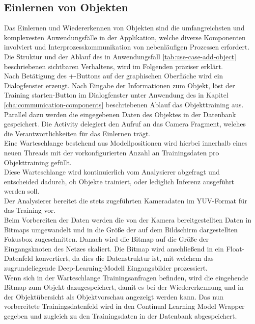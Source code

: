 \documentclass[oneside]{ausarbeitung}
\begin{document}
\subsection{Einlernen von Objekten}
\label{cha:train-objects}
Das Einlernen und Wiedererkennen von Objekten sind die umfangreichsten und komplexesten Anwendungsfälle in der Applikation, welche diverse Komponenten involviert und Interprozesskommunikation von nebenläufigen Prozessen erfordert.\\
Die Struktur und der Ablauf des in Anwendungsfall \ref{tab:use-case-add-object} beschriebenen sichtbaren Verhaltens, wird im Folgenden präziser erklärt.\\
Nach Betätigung des \glqq +\grqq-Buttons auf der graphischen Oberfläche wird ein Dialogfenster erzeugt. Nach Eingabe der Informationen zum Objekt, löst der \glqq Training starten\grqq-Button im Dialogfenster unter Anwendung des in Kapitel \ref{cha:communication-components} beschriebenen Ablauf das Objekttraining aus. Parallel dazu werden die eingegebenen Daten des Objektes in der Datenbank gespeichert. Die Activity delegiert den Aufruf an das Camera Fragment, welches die Verantwortlichkeiten für das Einlernen trägt. \\
Eine Warteschlange bestehend aus Modellpositionen wird hierbei innerhalb eines neuen Threads mit der vorkonfigurierten Anzahl an Trainingsdaten pro Objekttraining gefüllt.\\
Diese Warteschlange wird kontinuierlich vom Analysierer abgefragt und entscheided dadurch, ob Objekte trainiert, oder lediglich Inferenz ausgeführt werden soll.\\
Der Analysierer bereitet die stets zugeführten Kameradaten im YUV-Format für das Training vor.\\
Beim Vorbereiten der Daten werden die von der Kamera bereitgestellten Daten in Bitmaps umgewandelt und in die Größe der auf dem Bildschirm dargestellten Fokusbox zugeschnitten. Danach wird die Bitmap auf die Größe der Eingangsknoten des Netzes skaliert. Die Bitmap wird anschließend in ein Float-Datenfeld konvertiert, da dies die Datenstruktur ist, mit welchem das zugrundeliegende Deep-Learning-Modell Eingangsbilder prozessiert.\\
Wenn sich in der Warteschlange Trainingsanfragen befinden, wird die eingehende Bitmap zum Objekt dazugespeichert, damit es bei der Wiedererkennung und in der Objektübersicht als Objektvorschau angezeigt werden kann. Das nun vorbereitete Trainingsdatenfeld wird in den Continual Learning Model Wrapper gegeben und zugleich zu den Trainingsdaten in der Datenbank abgespeichert.\\
\end{document}
